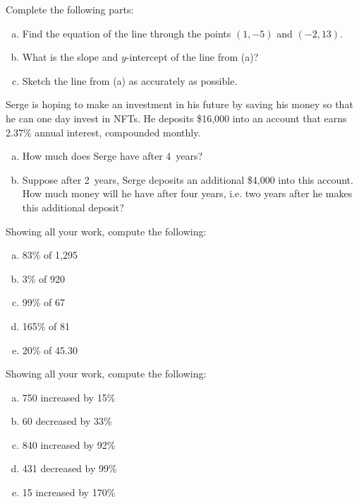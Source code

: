 \documentclass[11pt,letterpaper]{article}
\begin{document}
\prob Complete the following parts: 
        \begin{enumerate}[(a)]
        \item Find the equation of the line through the points $(1, -5)$ and $(-2, 13)$. 
        \item What is the slope and $y$-intercept of the line from (a)? 
        \item Sketch the line from (a) as accurately as possible. 
        \end{enumerate} \pspace


\prob Serge is hoping to make an investment in his future by saving his money so that he can one day invest in NFTs. He deposits \$16,000 into an account that earns 2.37\% annual interest, compounded monthly.
	\begin{enumerate}[(a)]
	\item How much does Serge have after 4~years?
	\item Suppose after 2~years, Serge deposits an additional \$4,000 into this account. How much money will he have after four years, i.e. two years after he makes this additional deposit? 
	\end{enumerate} \pspace


\prob Showing all your work, compute the following:
	\begin{enumerate}[(a)]
	\item 83\% of 1,295
	\item 3\% of 920
	\item 99\% of 67
	\item 165\% of 81
	\item 20\% of 45.30
	\end{enumerate} \pspace


\prob Showing all your work, compute the following:
	\begin{enumerate}[(a)]
	\item 750 increased by 15\%
	\item 60 decreased by 33\%
	\item 840 increased by 92\%
	\item 431 decreased by 99\%
	\item 15 increased by 170\%
	\end{enumerate} \pspace
\end{document}
